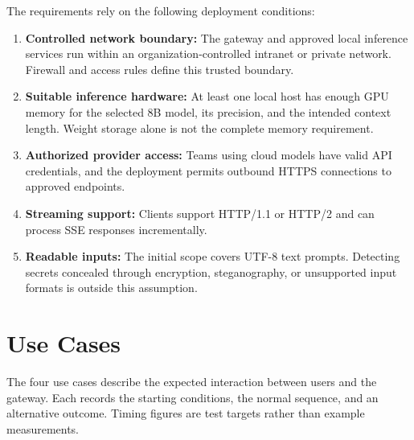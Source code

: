 The requirements rely on the following deployment conditions:
\begin{enumerate}
    \item \textbf{Controlled network boundary:} The gateway and approved local inference services run within an organization-controlled intranet or private network. Firewall and access rules define this trusted boundary.
    \item \textbf{Suitable inference hardware:} At least one local host has enough GPU memory for the selected 8B model, its precision, and the intended context length. Weight storage alone is not the complete memory requirement.
    \item \textbf{Authorized provider access:} Teams using cloud models have valid API credentials, and the deployment permits outbound HTTPS connections to approved endpoints.
    \item \textbf{Streaming support:} Clients support HTTP/1.1 or HTTP/2 and can process SSE responses incrementally.
    \item \textbf{Readable inputs:} The initial scope covers UTF-8 text prompts. Detecting secrets concealed through encryption, steganography, or unsupported input formats is outside this assumption.
\end{enumerate}

\section{Use Cases}
\label{sec:use-cases}

The four use cases describe the expected interaction between users and the gateway. Each records the starting conditions, the normal sequence, and an alternative outcome. Timing figures are test targets rather than example measurements.

